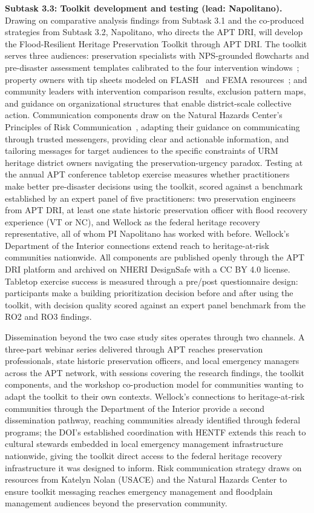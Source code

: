 \documentclass[11pt]{article}
\begin{document}
\textbf{Subtask 3.3: Toolkit development and testing (lead: Napolitano).}
Drawing on comparative analysis findings from Subtask 3.1 and the co-produced
strategies from Subtask 3.2, Napolitano, who directs the APT DRI, will develop
the Flood-Resilient Heritage Preservation Toolkit through APT DRI.
The toolkit serves three audiences: preservation specialists with NPS-grounded
flowcharts and pre-disaster assessment templates calibrated to the four intervention
windows~\cite{maalouf2025a,maalouf2025b}; property owners with tip sheets modeled
on FLASH~\cite{FLASH-SafeRoomChecklist} and FEMA resources~\cite{FEMA-ProtectYourProperty};
and community leaders with intervention comparison results, exclusion pattern maps,
and guidance on organizational structures that enable district-scale collective action.
Communication components draw on the Natural Hazards Center's Principles of Risk
Communication~\cite{campbell2021}, adapting their guidance on communicating through
trusted messengers, providing clear and actionable information, and tailoring
messages for target audiences to the specific constraints of URM heritage district
owners navigating the preservation-urgency paradox.
Testing at the annual APT conference tabletop exercise measures whether practitioners
make better pre-disaster decisions using the toolkit, scored against a benchmark
established by an expert panel of five practitioners: two preservation engineers
from APT DRI, at least one state historic preservation officer with flood recovery
experience (VT or NC), and Wellock as the federal heritage recovery representative,
all of whom PI Napolitano has worked with before.
Wellock's Department of the Interior connections extend reach to heritage-at-risk
communities nationwide.
All components are published openly through the APT DRI platform and archived on
NHERI DesignSafe with a CC BY 4.0 license.
Tabletop exercise success is measured through a pre/post questionnaire design:
participants make a building prioritization decision before and after using the
toolkit, with decision quality scored against an expert panel benchmark from the
RO2 and RO3 findings.

Dissemination beyond the two case study sites operates through two channels.
A three-part webinar series delivered through APT reaches preservation
professionals, state historic preservation officers, and local emergency managers
across the APT network, with sessions covering the research findings, the toolkit
components, and the workshop co-production model for communities wanting to adapt
the toolkit to their own contexts.
Wellock's connections to heritage-at-risk communities through the Department of
the Interior provide a second dissemination pathway, reaching communities already
identified through federal programs; the DOI's established coordination with HENTF
extends this reach to cultural stewards embedded in local emergency management
infrastructure nationwide, giving the toolkit direct access to the federal heritage
recovery infrastructure it was designed to inform.
Risk communication strategy draws on resources from Katelyn Nolan (USACE) and the
Natural Hazards Center to ensure toolkit messaging reaches emergency management
and floodplain management audiences beyond the preservation community.
\end{document}
